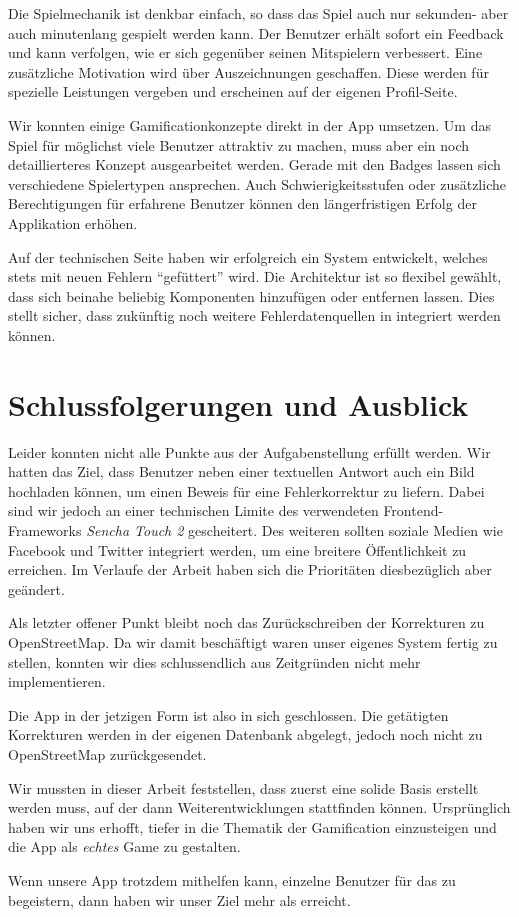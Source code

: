 Die Spielmechanik ist denkbar einfach, so dass das Spiel auch nur sekunden- aber auch  minutenlang gespielt werden kann.
Der Benutzer erhält sofort ein Feedback und kann verfolgen, wie er sich gegenüber seinen Mitspielern verbessert.
Eine zusätzliche Motivation wird über Auszeichnungen geschaffen.
Diese werden für spezielle Leistungen vergeben und erscheinen auf der eigenen Profil-Seite.

Wir konnten einige Gamificationkonzepte direkt in der App umsetzen.
Um das Spiel für möglichst viele Benutzer attraktiv zu machen, muss aber ein noch detaillierteres Konzept ausgearbeitet werden.
Gerade mit den Badges lassen sich verschiedene Spielertypen ansprechen.
Auch Schwierigkeitsstufen oder zusätzliche Berechtigungen für erfahrene Benutzer können den längerfristigen Erfolg der Applikation erhöhen.

Auf der technischen Seite haben wir erfolgreich ein System entwickelt, welches stets mit neuen Fehlern "`gefüttert"' wird.
Die Architektur ist so flexibel gewählt, dass sich beinahe beliebig Komponenten hinzufügen oder entfernen lassen.
Dies stellt sicher, dass zukünftig noch weitere Fehlerdatenquellen in \kort integriert werden können.

\section{Schlussfolgerungen und Ausblick}
Leider konnten nicht alle Punkte aus der Aufgabenstellung erfüllt werden.
Wir hatten das Ziel, dass Benutzer neben einer textuellen Antwort auch ein Bild hochladen können, um einen Beweis für eine Fehlerkorrektur zu liefern.
Dabei sind wir jedoch an einer technischen Limite des verwendeten Frontend-Frameworks \emph{Sencha Touch 2} gescheitert.
Des weiteren sollten soziale Medien wie Facebook und Twitter integriert werden, um eine breitere Öffentlichkeit zu erreichen.
Im Verlaufe der Arbeit haben sich die Prioritäten diesbezüglich aber geändert.

Als letzter offener Punkt bleibt noch das Zurückschreiben der Korrekturen zu \gls{OpenStreetMap}.
Da wir damit beschäftigt waren unser eigenes System fertig zu stellen, konnten wir dies schlussendlich aus Zeitgründen nicht mehr implementieren.

Die App in der jetzigen Form ist also in sich geschlossen. Die getätigten Korrekturen werden in der eigenen Datenbank abgelegt, jedoch noch nicht zu \gls{OpenStreetMap} zurückgesendet.

Wir mussten in dieser Arbeit feststellen, dass zuerst eine solide Basis erstellt werden muss, auf der dann Weiterentwicklungen stattfinden können.
Ursprünglich haben wir uns erhofft, tiefer in die Thematik der \gls{Gamification} einzusteigen und die App als \emph{echtes} Game zu gestalten.

Wenn unsere App trotzdem mithelfen kann, einzelne Benutzer für das  zu begeistern, dann haben wir unser  Ziel mehr als erreicht.